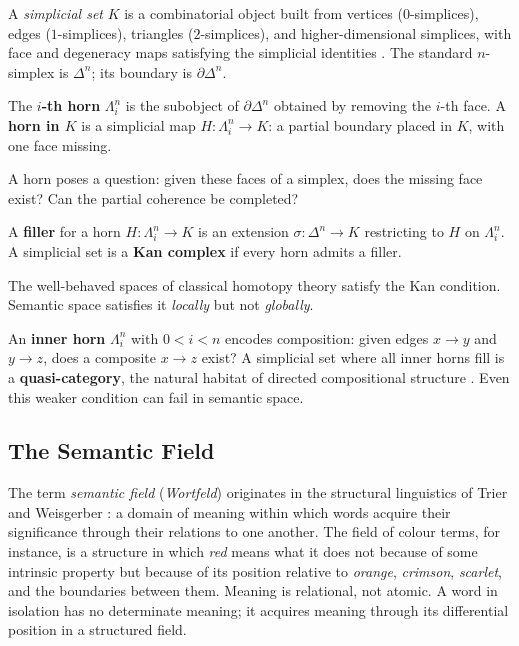 A \emph{simplicial set} $K$ is a combinatorial object built from vertices ($0$-simplices), edges ($1$-simplices), triangles ($2$-simplices), and higher-dimensional simplices, with face and degeneracy maps satisfying the simplicial identities \cite{friedman2012elementary, goerss2009simplicial}. The standard $n$-simplex is $\Delta^n$; its boundary is $\partial\Delta^n$.

\begin{definition}[Horn]
\label{def:horn}
The \textbf{$i$-th horn} $\Lambda^n_i$ is the subobject of $\partial\Delta^n$ obtained by removing the $i$-th face. A \textbf{horn in $K$} is a simplicial map $H : \Lambda^n_i \to K$: a partial boundary placed in $K$, with one face missing.
\end{definition}

A horn poses a question: given these faces of a simplex, does the missing face exist? Can the partial coherence be completed?

\begin{definition}
A \textbf{filler} for a horn $H : \Lambda^n_i \to K$ is an extension $\sigma : \Delta^n \to K$ restricting to $H$ on $\Lambda^n_i$. A simplicial set is a \textbf{Kan complex} if every horn admits a filler.
\end{definition}

The well-behaved spaces of classical homotopy theory satisfy the Kan condition. Semantic space satisfies it \emph{locally} but not \emph{globally}.

An \textbf{inner horn} $\Lambda^n_i$ with $0 < i < n$ encodes composition: given edges $x \to y$ and $y \to z$, does a composite $x \to z$ exist? A simplicial set where all inner horns fill is a \textbf{quasi-category}, the natural habitat of directed compositional structure \cite{lurie2009higher, joyal2008notes}. Even this weaker condition can fail in semantic space.


\subsection{The Semantic Field}

The term \emph{semantic field} (\emph{Wortfeld}) originates in the structural linguistics of Trier \cite{trier1931wortschatz} and Weisgerber \cite{weisgerber1962}: a domain of meaning within which words acquire their significance through their relations to one another. The field of colour terms, for instance, is a structure in which \emph{red} means what it does not because of some intrinsic property but because of its position relative to \emph{orange}, \emph{crimson}, \emph{scarlet}, and the boundaries between them. Meaning is relational, not atomic. A word in isolation has no determinate meaning; it acquires meaning through its differential position in a structured field.

